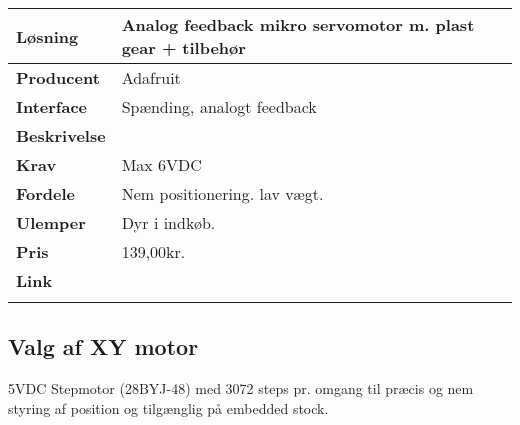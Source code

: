 \begin{table}[H] \centering
\begin{tabular}{|p{3cm}|p{11cm}|}
	\hline
	\textbf{Løsning}		
	    & Analog feedback mikro servomotor m. plast gear + tilbehør 
	\\ \hline
	\textbf{Producent} 		
	    & Adafruit
	\\ \hline
	\textbf{Interface} 		
	    & Spænding, analogt feedback
	\\ \hline
	\textbf{Beskrivelse} 	
	    & 
	\\ \hline
	\textbf{Krav} 			
	    & Max 6VDC
	\\ \hline
	\textbf{Fordele}		
	    & Nem positionering. lav vægt.
	\\ \hline
	\textbf{Ulemper} 		
	    & Dyr i indkøb.
	\\ \hline
	\textbf{Pris} 			
	    & 139,00kr.
	\\ \hline
	\textbf{Link} 			
	    & \url{}
	\\ \hline
	\multicolumn{2}{|c|}{} 
    \\ \hline
\end{tabular}
\end{table}

\subsection{Valg af XY motor}
5VDC Stepmotor (28BYJ-48)
med 3072 steps pr. omgang til præcis og nem styring af position og tilgænglig på embedded stock.